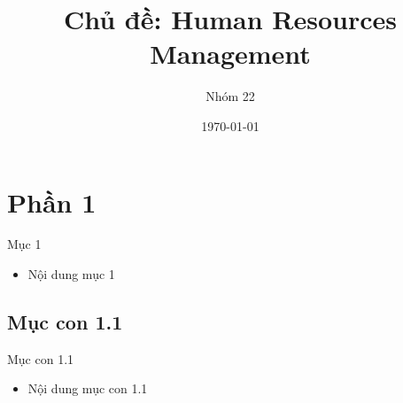 \documentclass{beamer}
\title[{\makebox[.15\paperwidth]{Human Resources Management}}]{Chủ đề: Human Resources Management}
\author[Nhóm 22]{Nhóm 22
}
\date[Data Warehouse \& BI]{\today}
\begin{document}
\begin{frame}
    \titlepage
\end{frame}












\frame{\tableofcontents}

\section{Phần 1}
\begin{frame}{Mục 1}
\begin{itemize}
\item Nội dung mục 1
\end{itemize}
\end{frame}

\subsection{Mục con 1.1}
\begin{frame}{Mục con 1.1}
\begin{itemize}
\item Nội dung mục con 1.1
\end{itemize}
\end{frame}
\end{document}
